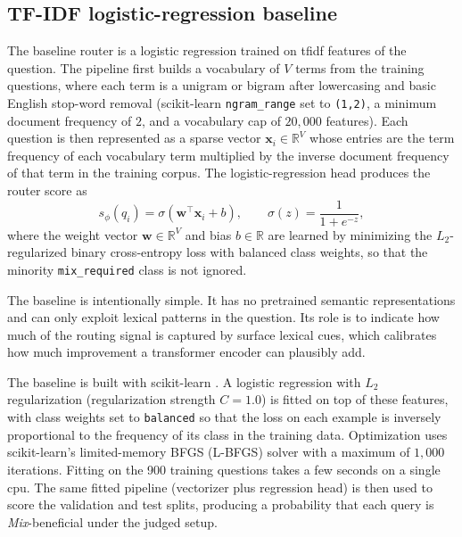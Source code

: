 \documentclass[english, bibtex]{kththesis}               %
\numberwithin{listing}{chapter}
\providecommand{\DIFaddtex}[1]{{\protect\color{blue} \sf #1}} %
\providecommand{\DIFaddbegin}{} %
\providecommand{\DIFaddend}{} %
\providecommand{\DIFadd}[1]{\texorpdfstring{\DIFaddtex{#1}}{#1}} %
\begin{document}
\DIFaddend \subsection{TF-IDF logistic-regression baseline}
\label{sec:methodTfidf}

The baseline router is a logistic regression trained on \gls{tfidf} features of the question. The pipeline first builds a vocabulary of \(V\) terms from the training questions, where each term is a unigram or bigram after lowercasing and basic English stop-word removal \DIFaddbegin \DIFadd{(scikit-learn \texttt{ngram\_range} set to \texttt{(1,2)}, a minimum document frequency of $2$, and a vocabulary cap of $20{,}000$ features)}\DIFaddend . Each question is then represented as a sparse vector \(\mathbf{x}_i \in \mathbb{R}^{V}\) whose entries are the term frequency of each vocabulary term multiplied by the inverse document frequency of that term in the training corpus. The logistic-regression head produces the router score as
\begin{equation}
\label{eq:tfidfScore}
s_\phi(q_i) = \sigma(\mathbf{w}^\top \mathbf{x}_i + b),
\qquad
\sigma(z) = \frac{1}{1 + e^{-z}},
\end{equation}
where the weight vector \(\mathbf{w} \in \mathbb{R}^{V}\) and bias \(b \in \mathbb{R}\) are learned by minimizing the $L_2$-regularized binary cross-entropy loss with balanced class weights, so that the minority \texttt{mix\_required} class is not ignored.

The baseline is intentionally simple. It has no pretrained semantic representations and can only exploit lexical patterns in the question. Its role is to indicate how much of the routing signal is captured by surface lexical cues, which calibrates how much improvement a transformer encoder can plausibly add.

\DIFaddbegin \DIFadd{The baseline is built with scikit-learn \cite{pedregosa2011scikit}. A logistic regression with $L_2$ regularization (regularization strength $C=1.0$) is fitted on top of these features, with class weights set to \texttt{balanced} so that the loss on each example is inversely proportional to the frequency of its class in the training data. Optimization uses scikit-learn's limited-memory BFGS (L-BFGS) solver \cite{liu1989limited} with a maximum of $1{,}000$ iterations. Fitting on the 900 training questions takes a few seconds on a single \gls{cpu}. The same fitted pipeline (vectorizer plus regression head) is then used to score the validation and test splits, producing a probability that each query is \emph{Mix}-beneficial under the judged setup.
}
\end{document}
